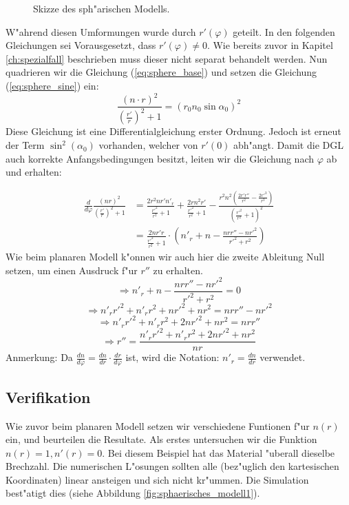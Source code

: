 \begin{refsection}
\begin{figure}
\caption{Skizze des sph"arischen Modells. \label{fig:sphere_skizze}}
\end{figure}
W"ahrend diesen Umformungen wurde durch $r'(\varphi)$ geteilt. 
In den folgenden Gleichungen sei Vorausgesetzt, dass $r'(\varphi) \neq 0$. 
Wie bereits zuvor in Kapitel \ref{ch:spezialfall} beschrieben muss dieser nicht separat behandelt werden.
Nun quadrieren wir die Gleichung (\ref{eq:sphere_base}) und setzen die Gleichung (\ref{eq:sphere_sine}) ein:
$$\frac{(n \cdot r)^2}{\displaystyle\left( \frac{r'}{r} \right)^2 +1} = (r_0 n_0 \sin \alpha_0)^2$$
Diese Gleichung ist eine Differentialgleichung erster Ordnung. 
Jedoch ist erneut der Term $\sin^2(\alpha_0)$ vorhanden, welcher von $r'(0)$ abh"angt. 
Damit die DGL auch korrekte Anfangsbedingungen besitzt, leiten wir die Gleichung nach $\varphi$ ab und erhalten:

\begin{equation}
\begin{aligned}
\frac{d}{d\varphi}\frac{(n r)^2}{\left(\displaystyle\frac{r'}{r}\right)^2 + 1} 
& = \frac{2 r^2 n r' n'_r}{\displaystyle\frac{r'^2}{r^2}+1}+\frac{2 r n^2 r'}{\displaystyle\frac{r'^2}{r^2}+1}-\frac{r^2 n^2 \left(\displaystyle\frac{2 r' r''}{r^2}-\frac{2 r'^3}{r^3}\right)}{\left(\displaystyle\frac{r'^2}{r^2}+1\right)^2} \\
& = \frac{2n r' r}{\displaystyle\frac{r'^2}{r^2}+1} \cdot \left( n'_r + n - \frac{n r r'' - n r'^2}{r'^2 + r^2} \right)
\end{aligned}
\end{equation}
Wie beim planaren Modell k"onnen wir auch hier die zweite Ableitung Null setzen, um einen Ausdruck f"ur $r''$ zu erhalten.
\begin{equation}
\Rightarrow n'_r + n - \frac{n r r'' - n r'^2}{r'^2 + r^2} = 0
\end{equation}
$$\Rightarrow n'_r r'^2  + n'_r r^2 + n r'^2 + nr^2 = n r r'' - n r'^2$$
$$\Rightarrow n'_r r'^2 + n'_r r^2 + 2 n r'^2 + n r^2 = n r r''$$
\begin{equation} \label{eq:sphere_allg}
\Rightarrow r'' = \frac{n'_r r'^2 + n'_r r^2 + 2 n r'^2 + n r^2}{n r}
\end{equation}
Anmerkung: Da $\frac{dn}{d\varphi} = \frac{dn}{dr} \cdot \frac{dr}{d\varphi}$ ist, wird die Notation: $n'_r = \frac{dn}{dr}$ verwendet.

\subsection{Verifikation}
Wie zuvor beim planaren Modell setzen wir verschiedene Funtionen f"ur $n(r)$ ein, und beurteilen die Resultate. 
Als erstes untersuchen wir die Funktion $n(r) = 1, n'(r) = 0$. 
Bei diesem Beispiel hat das Material "uberall dieselbe Brechzahl.
Die numerischen L"osungen sollten alle (bez"uglich den kartesischen Koordinaten) linear ansteigen und sich nicht kr"ummen. Die Simulation best"atigt dies (siehe Abbildung \ref{fig:sphaerisches_modell1}).


\end{refsection}
